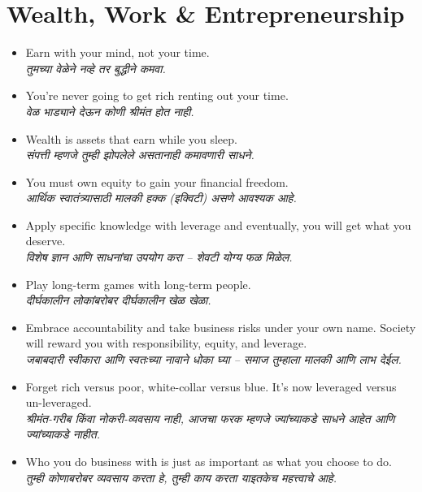 \section*{Wealth, Work \& Entrepreneurship}
\begin{itemize}
  \item Earn with your mind, not your time. \\
  \textit{तुमच्या वेळेने नव्हे तर बुद्धीने कमवा.}

  \item You’re never going to get rich renting out your time. \\
  \textit{वेळ भाड्याने देऊन कोणी श्रीमंत होत नाही.}

  \item Wealth is assets that earn while you sleep. \\
  \textit{संपत्ती म्हणजे तुम्ही झोपलेले असतानाही कमावणारी साधने.}

  \item You must own equity to gain your financial freedom. \\
  \textit{आर्थिक स्वातंत्र्यासाठी मालकी हक्क (इक्विटी) असणे आवश्यक आहे.}

  \item Apply specific knowledge with leverage and eventually, you will get what you deserve. \\
  \textit{विशेष ज्ञान आणि साधनांचा उपयोग करा – शेवटी योग्य फळ मिळेल.}

  \item Play long-term games with long-term people. \\
  \textit{दीर्घकालीन लोकांबरोबर दीर्घकालीन खेळ खेळा.}

  \item Embrace accountability and take business risks under your own name. Society will reward you with responsibility, equity, and leverage. \\
  \textit{जबाबदारी स्वीकारा आणि स्वतःच्या नावाने धोका घ्या – समाज तुम्हाला मालकी आणि लाभ देईल.}

  \item Forget rich versus poor, white-collar versus blue. It’s now leveraged versus un-leveraged. \\
  \textit{श्रीमंत-गरीब किंवा नोकरी-व्यवसाय नाही, आजचा फरक म्हणजे ज्यांच्याकडे साधने आहेत आणि ज्यांच्याकडे नाहीत.}

  \item Who you do business with is just as important as what you choose to do. \\
  \textit{तुम्ही कोणाबरोबर व्यवसाय करता हे, तुम्ही काय करता याइतकेच महत्त्वाचे आहे.}


\end{itemize}
